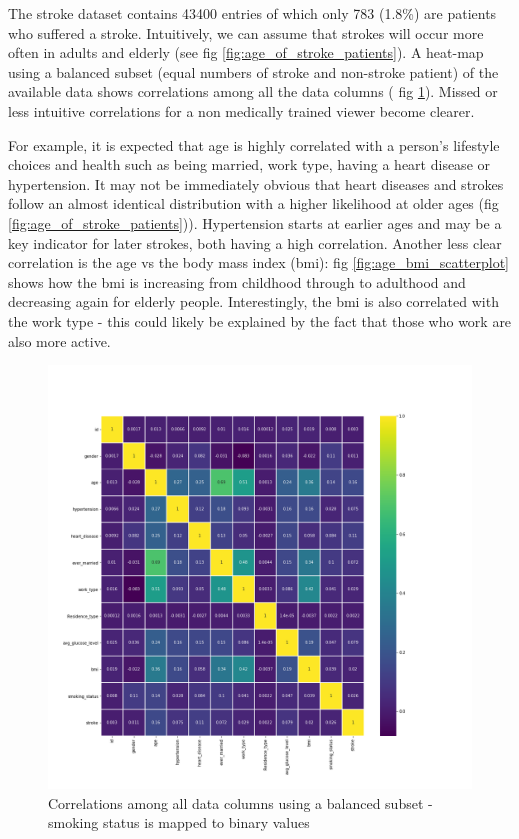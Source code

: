 \documentclass[proposal]{softeng}
\begin{document}
The stroke dataset contains 43400 entries of which only 783 (1.8\%) are patients who suffered a stroke. Intuitively, we can assume that strokes will occur more often in adults and elderly (see fig \ref{fig:age_of_stroke_patients}). A heat-map using a balanced subset (equal numbers of stroke and non-stroke patient) of the available data shows correlations among all the data columns ( fig \ref{fig:heatmap}). Missed or less intuitive correlations for a non medically trained viewer become clearer. 

For example, it is expected that age is highly correlated with a person's lifestyle choices and health such as being married, work type, having a heart disease or hypertension. It may not be immediately obvious that heart diseases and strokes follow an almost identical distribution with a higher likelihood at older ages (fig \ref{fig:age_of_stroke_patients})). Hypertension starts at earlier ages and may be a key indicator for later strokes, both having a high correlation. Another less clear correlation is the age vs the body mass index (bmi): fig \ref{fig:age_bmi_scatterplot} shows how the bmi is increasing from childhood through to adulthood and decreasing again for elderly people. Interestingly, the bmi is also correlated with the work type - this could likely be explained by the fact that those who work are also more active.

\begin{figure}[h!]
\centering
  \includegraphics[width=.73\textwidth]{images/building_ann/heatmap.png}
  \caption{Correlations among all data columns using a balanced subset - smoking status is mapped to binary values}
  \label{fig:heatmap}
\end{figure}
\end{document}
